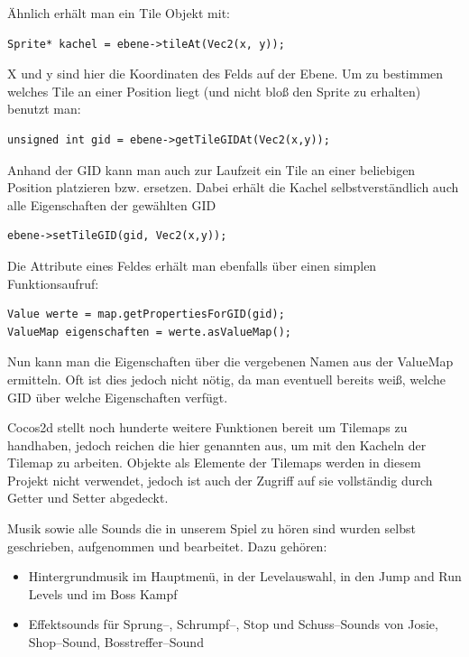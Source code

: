 Ähnlich erhält man ein Tile Objekt mit:

\begin{lstlisting}[style=singleline]
Sprite* kachel = ebene->tileAt(Vec2(x, y));
\end{lstlisting}

X und y sind hier die Koordinaten des Felds auf der Ebene.
Um zu bestimmen welches Tile an einer Position liegt (und nicht bloß den Sprite zu erhalten) benutzt man:

\begin{lstlisting}[style=singleline]
unsigned int gid = ebene->getTileGIDAt(Vec2(x,y));
\end{lstlisting}

Anhand der GID kann man auch zur Laufzeit ein Tile an einer beliebigen Position platzieren bzw. ersetzen. Dabei erhält die Kachel selbstverständlich auch alle Eigenschaften der gewählten GID	

\begin{lstlisting}[style=singleline]
ebene->setTileGID(gid, Vec2(x,y));
\end{lstlisting}

Die Attribute eines Feldes erhält man ebenfalls über einen simplen Funktionsaufruf:

\begin{lstlisting}[style=singleline]
Value werte = map.getPropertiesForGID(gid);
ValueMap eigenschaften = werte.asValueMap();
\end{lstlisting}

Nun kann man die Eigenschaften über die vergebenen Namen aus der ValueMap ermitteln. Oft ist dies jedoch nicht nötig, da man eventuell bereits weiß, welche GID über welche Eigenschaften verfügt.

Cocos2d stellt noch hunderte weitere Funktionen bereit um Tilemaps zu handhaben, jedoch reichen die hier genannten aus, um mit den Kacheln der Tilemap zu arbeiten. Objekte als Elemente der Tilemaps werden in diesem Projekt nicht verwendet, jedoch ist auch der Zugriff auf sie vollständig durch Getter und Setter abgedeckt.



\label{sec:2_Musik}
Musik sowie alle Sounds die in unserem Spiel \gamename zu hören sind wurden selbst geschrieben, aufgenommen und bearbeitet. Dazu gehören:

\begin{itemize}
\item Hintergrundmusik im Hauptmenü, in der Levelauswahl, in den Jump and Run Levels und im Boss Kampf
\item Effektsounds für Sprung--, Schrumpf--, Stop und Schuss--Sounds von Josie, Shop--Sound, Bosstreffer--Sound
\end{itemize}


